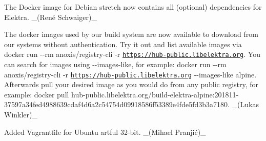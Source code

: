 \begin{DoxyItemize}
\item The Docker image for Debian stretch now contains all (optional) dependencies for Elektra. \+\_\+(René Schwaiger)\+\_\+
\item The docker images used by our build system are now available to download from our systems without authentication. Try it out and list available images via {\ttfamily docker run -\/-\/rm anoxis/registry-\/cli -\/r \href{https://hub-public.libelektra.org}{\tt https\+://hub-\/public.\+libelektra.\+org}}. You can search for images using {\ttfamily -\/-\/images-\/like}, for example\+: {\ttfamily docker run -\/-\/rm anoxis/registry-\/cli -\/r \href{https://hub-public.libelektra.org}{\tt https\+://hub-\/public.\+libelektra.\+org} -\/-\/images-\/like alpine}. Afterwards pull your desired image as you would do from any public registry, for example\+: {\ttfamily docker pull hub-\/public.\+libelektra.\+org/build-\/elektra-\/alpine\+:201811-\/37597a34fed4988639cdaf4d6a2c54754d09918586f53389e4fde5fd3b3a7180}. \+\_\+(\+Lukas Winkler)\+\_\+
\end{DoxyItemize}


\begin{DoxyItemize}
\item Added Vagrantfile for Ubuntu artful 32-\/bit. \+\_\+(Mihael Pranjić)\+\_\+
\end{DoxyItemize}



